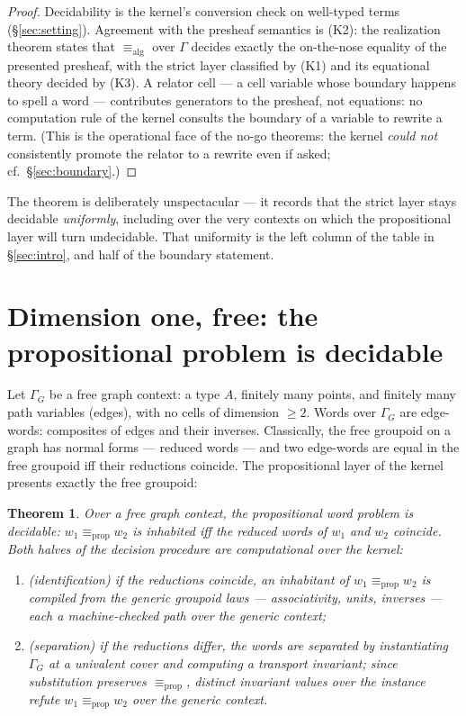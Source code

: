 \documentclass[11pt]{amsart}
\newtheorem{thm}{Theorem}[section]
\theoremstyle{definition}
\newcommand{\aconv}{\equiv_{\mathrm{alg}}}
\newcommand{\propeq}{\equiv_{\mathrm{prop}}}
\begin{document}
\begin{proof}
  Decidability is the kernel's conversion check on well-typed terms
  (\S\ref{sec:setting}).  Agreement with the presheaf semantics is
  (K2): the realization theorem states that $\aconv$ over $\Gamma$
  decides exactly the on-the-nose equality of the presented
  presheaf, with the strict layer classified by (K1) and its
  equational theory decided by (K3).  A relator cell --- a cell
  variable whose boundary happens to spell a word --- contributes
  generators to the presheaf, not equations: no computation rule of
  the kernel consults the boundary of a variable to rewrite a term.
  (This is the operational face of the no-go theorems: the kernel
  \emph{could not} consistently promote the relator to a rewrite
  even if asked; cf.\ \S\ref{sec:boundary}.)
\end{proof}

The theorem is deliberately unspectacular --- it records that the
strict layer stays decidable \emph{uniformly}, including over the
very contexts on which the propositional layer will turn
undecidable.  That uniformity is the left column of the table in
\S\ref{sec:intro}, and half of the boundary statement.

\section{Dimension one, free: the propositional problem is decidable}
\label{sec:free}

Let $\Gamma_G$ be a free graph context: a type $A$, finitely many
points, and finitely many path variables (edges), with no cells of
dimension $\geq 2$.  Words over $\Gamma_G$ are edge-words: composites
of edges and their inverses.  Classically, the free groupoid on a
graph has normal forms --- reduced words --- and two edge-words are
equal in the free groupoid iff their reductions coincide.  The
propositional layer of the kernel presents exactly the free
groupoid:

\begin{thm}
  \label{thm:free}
  Over a free graph context, the propositional word problem is
  decidable: $w_1 \propeq w_2$ is inhabited iff the reduced words of
  $w_1$ and $w_2$ coincide.  Both halves of the decision procedure
  are computational over the kernel:
  \begin{enumerate}
  \item (\emph{identification}) if the reductions coincide, an
    inhabitant of $w_1 \propeq w_2$ is compiled from the generic
    groupoid laws --- associativity, units, inverses ---
    each a machine-checked path over the generic context;
  \item (\emph{separation}) if the reductions differ, the words are
    separated by instantiating $\Gamma_G$ at a univalent cover and
    computing a transport invariant; since substitution preserves
    $\propeq$, distinct invariant values over the instance refute
    $w_1 \propeq w_2$ over the generic context.
  \end{enumerate}
\end{thm}
\end{document}
